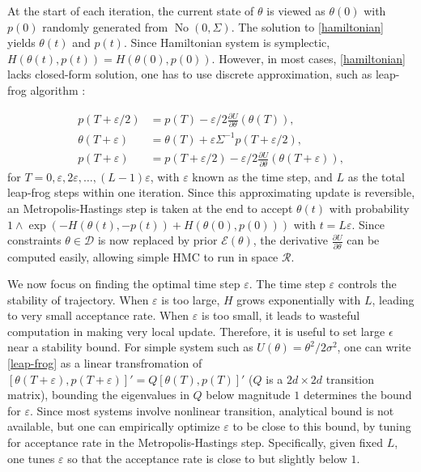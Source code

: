 \documentclass[10pt]{article}
\newcommand{\mc}[1]{\mathcal{#1}}
\DeclareMathOperator{\No}{No}
\begin{document}
At the start of each iteration, the current state of $\theta$ is viewed as $\theta(0)$ with $p(0)$ randomly generated from $\No(0, \Sigma)$. The solution to \eqref{hamiltonian} yields $\theta(t)$ and $p(t)$. Since Hamiltonian system is symplectic, $H(\theta(t),p(t))=H(\theta(0),p(0))$. However, in most cases, \eqref{hamiltonian} lacks closed-form solution, one has to use discrete approximation, such as leap-frog algorithm \citep{neal2011mcmc}:


\begin{equation}
\begin{aligned}
\label{leap-frog}
p(T+ \varepsilon/2) & = p(T) - \varepsilon/2 \frac{\partial U}{\partial  \theta } ( \theta (T)),\\
 \theta (T + \varepsilon) & =  \theta (T) + \varepsilon \Sigma^{-1}p(T+  \varepsilon/2),\\
p(T+ \varepsilon) &= p(T+ \varepsilon/2) - \varepsilon/2 \frac{\partial U}{\partial  \theta } ( \theta (T + \varepsilon)),
\end{aligned}
\end{equation}
for $T=0,\varepsilon, 2\varepsilon,\ldots, (L-1)\varepsilon$, with $\varepsilon$ known as the time step, and $L$ as the total leap-frog steps within one iteration. Since this approximating update is reversible, an Metropolis-Hastings step is taken at the end to accept $\theta(t)$ with probability $1\wedge \exp  \left( - H(\theta(t),-p(t)) + H(\theta(0),p(0))\right)$ with $t=L\varepsilon$. Since constraints $\theta \in \mc D$ is now replaced by prior $\mc E(\theta)$, the derivative $\frac{\partial U}{\partial  \theta }$ can be computed easily, allowing simple HMC to run in space $\mc R$.

We now focus on finding the optimal time step $\varepsilon$. The time step $\varepsilon$ controls the stability of trajectory. When $\varepsilon$ is too large, $H$ grows exponentially with $L$, leading to very small acceptance rate. When $\varepsilon$ is too small, it leads to wasteful computation in making very local update. Therefore, it is useful to set large $\epsilon$ near a stability bound. For simple system such as $U(\theta)= {\theta^2}/{2\sigma^2}$, one can write \eqref{leap-frog} as a linear transfromation of $[\theta(T+\varepsilon),p(T+\varepsilon)]' = Q [ \theta(T),p(T)]'$ ($Q$ is a $2d\times 2d$ transition matrix), bounding the eigenvalues in $Q$ below magnitude $1$ determines the bound for $\varepsilon$. Since most systems involve nonlinear transition, analytical bound is not available, but one can empirically optimize $\varepsilon$ to be close to this bound, by tuning for acceptance rate in the Metropolis-Hastings step. Specifically, given fixed $L$, one tunes $\varepsilon$ so that the acceptance rate is close to but slightly below $1$.
\end{document}
